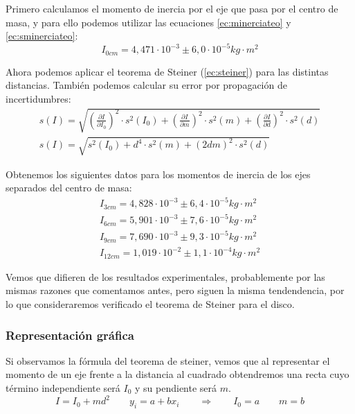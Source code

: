 \documentclass[12pt, a4paper, titlepage]{article}
\begin{document}
  Primero calculamos el momento de inercia por el eje que pasa por el centro de masa, y para ello podemos utilizar las ecuaciones \ref{ec:minerciateo} y \ref{ec:sminerciateo}:
  \begin{equation*}
    I_{0cm} = 4,471 \cdot 10^{-3} \pm 6,0 \cdot 10^{-5} kg \cdot m^2
  \end{equation*}

  Ahora podemos aplicar el teorema de Steiner (\ref{ec:steiner}) para las distintas distancias. También podemos calcular su error por propagación de incertidumbres:
  \begin{gather}
    s(I) = \sqrt{\left( \frac{\partial I}{\partial I_0} \right)^2 \cdot s^2(I_0) + \left( \frac{\partial I}{\partial m} \right)^2 \cdot s^2(m) + \left( \frac{\partial I}{\partial d} \right)^2 \cdot s^2(d)} \nonumber \\
    s(I) = \sqrt{s^2(I_0) + d^4 \cdot s^2(m) + \left( 2 d m \right)^2 \cdot s^2(d)} \label{ec:ssteiner}
  \end{gather}

  Obtenemos los siguientes datos para los momentos de inercia de los ejes separados del centro de masa:
  \begin{gather*}
    I_{3cm} = 4,828 \cdot 10^{-3} \pm 6,4 \cdot 10^{-5} kg \cdot m^2 \\
    I_{6cm} = 5,901 \cdot 10^{-3} \pm 7,6 \cdot 10^{-5} kg \cdot m^2 \\
    I_{9cm} = 7,690 \cdot 10^{-3} \pm 9,3 \cdot 10^{-5} kg \cdot m^2 \\
    I_{12cm} = 1,019 \cdot 10^{-2} \pm 1,1 \cdot 10^{-4} kg \cdot m^2
  \end{gather*}

  Vemos que difieren de los resultados experimentales, probablemente por las mismas razones que comentamos antes, pero siguen la misma tendendencia, por lo que consideraremos verificado el teorema de Steiner para el disco.

  \subsubsection{Representación gráfica}

  Si observamos la fórmula del teorema de steiner, vemos que al representar el momento de un eje frente a la distancia al cuadrado obtendremos una recta cuyo término independiente será $I_0$ y su pendiente será $m$.
  \begin{equation*}
    I = I_0 + md^2 \qquad y_i = a + bx_i \qquad \Rightarrow \qquad
    I_0 = a \qquad m = b
  \end{equation*}
\end{document}
